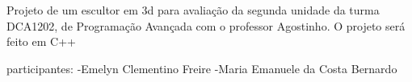 Projeto de um escultor em 3d para avaliação da segunda unidade da turma DCA1202, de Programação Avançada com o professor Agostinho. O projeto será feito em C++

participantes\+: -\/Emelyn Clementino Freire -\/Maria Emanuele da Costa Bernardo 
